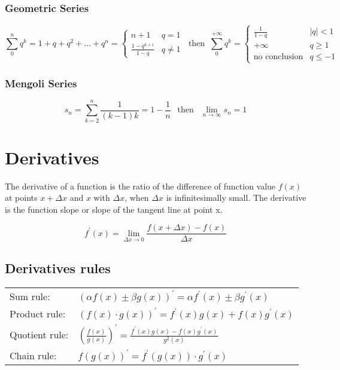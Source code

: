 \subsubsection{Geometric Series}
\[
\sum_{0}^{n}q^k=1+q+q^2+...+q^n= \begin{cases}
									n+1 & q=1 \\
									\frac{1-q^{k+1}}{1-q} & q\ne1
								 \end{cases}
~ \text{ then } ~
\sum_{0}^{+\infty}q^k= \begin{cases}
\frac{1}{1-q} & \left|q\right|<1 \\
+\infty & q\ge1 \\
\text{no conclusion} & q\le-1
\end{cases}
\]

\subsubsection{Mengoli Series}
\[
s_n=\sum_{k=2}^{n}\frac{1}{(k-1)k}=1-\frac{1}{n} ~~ \text{ then } ~~  \lim_{n\rightarrow\infty}s_n=1
\]

\section{Derivatives}
The derivative of a function is the ratio of the difference of function value $ f(x) $ at points $ x+\Delta x $ and $ x $ with $ \Delta x $, when $ \Delta x $ is infinitesimally small. The derivative is the function slope or slope of the tangent line at point x.

\[
f^\prime(x) = \lim_{\Delta x \rightarrow 0} \frac{ f( x + \Delta x ) - f(x) }{\Delta x}
\]

\subsection{Derivatives rules}
\begin{tabular}{ l l }
Sum rule:      & $ \displaystyle (\alpha f(x) \pm \beta g(x) )^\prime = \alpha f^\prime(x) \pm \beta g^\prime(x) $  \\
Product rule:  & $ \displaystyle (f(x) \cdot g(x) )^\prime = f^\prime(x) g(x) + f(x) g^\prime(x) $ \\
Quotient rule: & $ \displaystyle \left( \frac{f(x)}{g(x)} \right)^\prime = \frac{ f^\prime(x) g(x) - f(x) g^\prime(x) }{ g^2(x) } $ \\
Chain rule:    & $ \displaystyle f\left( g(x) \right) ^\prime = f^\prime\left( g(x) \right) \cdot g^\prime(x) $
\end{tabular}


